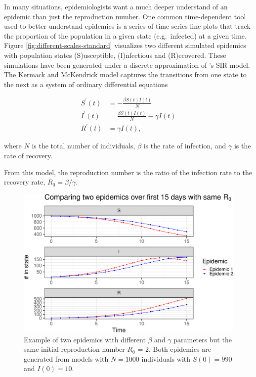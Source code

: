 \documentclass[
  shortnames]{jss}
\begin{document}
In many situations, epidemiologists want a much deeper understand of an
epidemic than just the reproduction number. One common time-dependent
tool used to better understand epidemics is a series of time series line
plots that track the proportion of the population in a given state
(e.g.~infected) at a given time. Figure
\ref{fig:different-scales-standard} visualizes two different simulated
epidemics with population states (S)usceptible, (I)nfectious and
(R)ecovered. These simulations have been generated under a discrete
approximation of \citet{Kermack1927}'s SIR model. The Kermack and
McKendrick model captures the transitions from one state to the next as
a system of ordinary differential equations

\begin{align}\label{eq:sir-ode}
    S^\prime(t) &= -\frac{\beta S(t)I(t)}{N} \\
    I^\prime(t) &= \frac{\beta S(t)I(t)}{N} - \gamma I(t) \nonumber\\
    R^\prime(t) &= \gamma I(t) \nonumber,
\end{align}

where \(N\) is the total number of individuals, \(\beta\) is the rate of
infection, and \(\gamma\) is the rate of recovery.

From this model, the reproduction number is the ratio of the infection
rate to the recovery rate, \(R_0 = \beta/\gamma\).

\begin{CodeChunk}
\begin{figure}[H]

{\centering \includegraphics{Figs/unnamed-chunk-2-1} 

}

\caption{\label{fig:different-scales-standard}Example of two epidemics with different $\beta$ and $\gamma$ parameters but the same initial reproduction number $R_0$ = 2.  Both epidemics are generated from models with $N= 1000$ individuals with $S(0) = 990$ and $I(0) = 10$.}\label{fig:unnamed-chunk-2}
\end{figure}
\end{CodeChunk}
\end{document}
